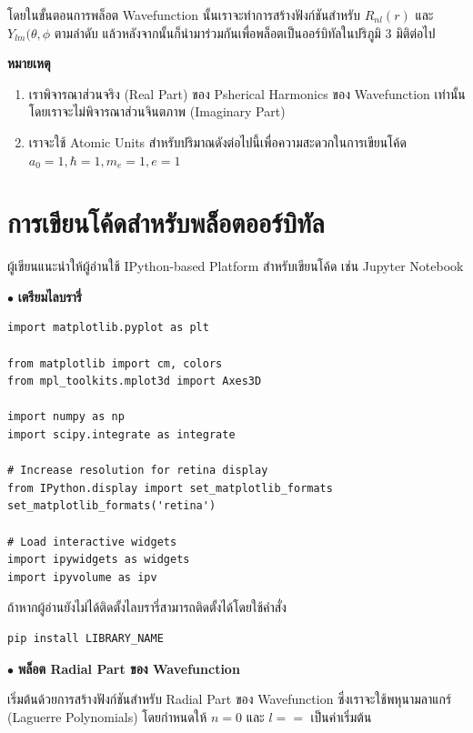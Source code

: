 โดยในขั้นตอนการพล็อต Wavefunction นั้นเราจะทำการสร้างฟังก์ชันสำหรับ $R_{nl}(r)$ และ $Y_{lm}(\theta, \phi$ ตามลำดับ
แล้วหลังจากนั้นก็นำมาร่วมกันเพื่อพล็อตเป็นออร์บิทัลในปริภูมิ 3 มิติต่อไป

\noindent \textbf{หมายเหตุ} 
\begin{enumerate}[topsep=0pt,noitemsep]
    \item เราพิจารณาส่วนจริง (Real Part) ของ Psherical Harmonics ของ Wavefunction เท่านั้น โดยเราจะไม่พิจารณาส่วนจินตภาพ 
    (Imaginary Part)

    \item เราจะใช้ Atomic Units สำหรับปริมาณดังต่อไปนี้เพื่อความสะดวกในการเขียนโค้ด $a_0=1, \hbar=1, m_e=1, e=1$
\end{enumerate}

\section{การเขียนโค้ดสำหรับพล็อตออร์บิทัล}
\label{sec:code_hydro_wfn}

ผู้เขียนแนะนำให้ผู้อ่านใช้ IPython-based Platform สำหรับเขียนโค้ด เช่น Jupyter Notebook

\bigskip

$\bullet$ \textbf{เตรียมไลบรารี่}

\begin{lstlisting}[style=MyPython]
%matplotlib inline
import matplotlib.pyplot as plt

from matplotlib import cm, colors
from mpl_toolkits.mplot3d import Axes3D

import numpy as np
import scipy.integrate as integrate

# Increase resolution for retina display
from IPython.display import set_matplotlib_formats
set_matplotlib_formats('retina')

# Load interactive widgets
import ipywidgets as widgets
import ipyvolume as ipv
\end{lstlisting}

\noindent ถ้าหากผู้อ่านยังไม่ได้ติดตั้งไลบรารี่สามารถติดตั้งได้โดยใช้คำสั่ง

\begin{lstlisting}[style=MyBash]
pip install LIBRARY_NAME
\end{lstlisting}

\bigskip

$\bullet$ \textbf{พล็อต Radial Part ของ Wavefunction}

เริ่มต้นด้วยการสร้างฟังก์ชันสำหรับ Radial Part ของ Wavefunction ซึ่งเราจะใช้พหุนามลาแกร์ (Laguerre Polynomials) โดยกำหนดให้ 
$n = 0$ และ $l = =$ เป็นค่าเริ่มต้น

